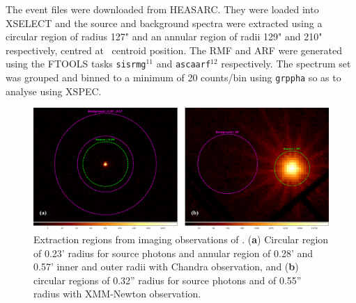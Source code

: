     	The event files were downloaded from HEASARC. They were loaded into XSELECT and the source and background spectra were extracted using a circular region of radius 127" and an annular region of radii 129" and 210" respectively, centred at \source\ centroid position. The RMF and ARF were generated using the FTOOLS tasks \texttt{sisrmg}$^{11}$ and \texttt{ascaarf}$^{12}$ respectively. The spectrum set was grouped and binned to a minimum of 20 counts/bin using \texttt{grppha} so as to analyse using XSPEC.
    	
    	\begin{figure}[!htb]
	        \centering
	        \includegraphics[width=\textwidth]{figures/rx-j0925-7-4758_src-bkg}
	        \caption{Extraction regions from imaging observations of \source. (\textbf{a}) Circular region of 0.23' radius for source photons and annular region of 0.28' and 0.57' inner and outer radii with Chandra observation, and (\textbf{b}) circular regions of 0.32'' radius for source photons and of 0.55'' radius with XMM-Newton observation.}
	        \label{fig:src-bkg}
	    \end{figure}
	    
    
